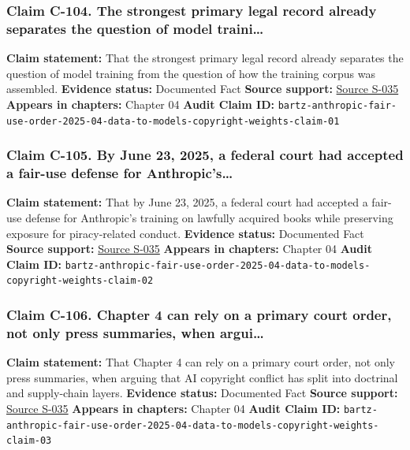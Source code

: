 \documentclass[
  american,
  11pt,
  letterpaper,
]{article}
\begin{document}
\subsubsection{Claim C-104. The strongest primary legal record already
separates the question of model
traini\ldots{}}\label{claim-c-104-the-strongest-primary-legal-record-already-separates-the-question-of-model-traini}

\textbf{Claim statement:} That the strongest primary legal record
already separates the question of model training from the question of
how the training corpus was assembled. \textbf{Evidence status:}
Documented Fact \textbf{Source support:}
\hyperref[source-s-035-bartz-et-al-v-anthropic-pbc-order-on-fair-use]{Source
S-035} \textbf{Appears in chapters:} Chapter 04 \textbf{Audit Claim ID:}
\texttt{bartz-anthropic-fair-use-order-2025-04-data-to-models-copyright-weights-claim-01}

\subsubsection{Claim C-105. By June 23, 2025, a federal court had
accepted a fair-use defense for
Anthropic's\ldots{}}\label{claim-c-105-by-june-23-2025-a-federal-court-had-accepted-a-fair-use-defense-for-anthropic-s}

\textbf{Claim statement:} That by June 23, 2025, a federal court had
accepted a fair-use defense for Anthropic's training on lawfully
acquired books while preserving exposure for piracy-related conduct.
\textbf{Evidence status:} Documented Fact \textbf{Source support:}
\hyperref[source-s-035-bartz-et-al-v-anthropic-pbc-order-on-fair-use]{Source
S-035} \textbf{Appears in chapters:} Chapter 04 \textbf{Audit Claim ID:}
\texttt{bartz-anthropic-fair-use-order-2025-04-data-to-models-copyright-weights-claim-02}

\subsubsection{Claim C-106. Chapter 4 can rely on a primary court order,
not only press summaries, when
argui\ldots{}}\label{claim-c-106-chapter-4-can-rely-on-a-primary-court-order-not-only-press-summaries-when-argui}

\textbf{Claim statement:} That Chapter 4 can rely on a primary court
order, not only press summaries, when arguing that AI copyright conflict
has split into doctrinal and supply-chain layers. \textbf{Evidence
status:} Documented Fact \textbf{Source support:}
\hyperref[source-s-035-bartz-et-al-v-anthropic-pbc-order-on-fair-use]{Source
S-035} \textbf{Appears in chapters:} Chapter 04 \textbf{Audit Claim ID:}
\texttt{bartz-anthropic-fair-use-order-2025-04-data-to-models-copyright-weights-claim-03}
\end{document}
